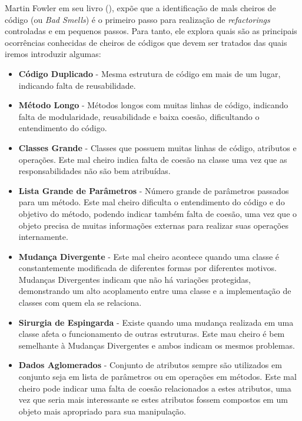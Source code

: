 %

Martin Fowler em seu livro (\citeyear{fowler1999}), expõe que a identificação de mals cheiros de código (ou \emph{Bad Smells}) é o primeiro passo para realização de \emph{refactorings} controladas e em pequenos passos. Para tanto, ele explora quais são as principais ocorrências conhecidas de cheiros de códigos que devem ser tratados das quais iremos introduzir algumas:

\begin{itemize}

\item \textbf{Código Duplicado} - Mesma estrutura de código em mais de um lugar, indicando falta de reusabilidade.

\item \textbf{Método Longo} - Métodos longos com muitas linhas de código, indicando falta de modularidade, reusabilidade e baixa coesão, dificultando o entendimento do código.

\item \textbf{Classes Grande} - Classes que possuem muitas linhas de código, atributos e operações. Este mal cheiro indica falta de coesão na classe uma vez que as responsabilidades não são bem atribuídas.

\item \textbf{Lista Grande de Parâmetros} - Número grande de parâmetros passados para um método. Este mal cheiro dificulta o entendimento do código e do objetivo do método, podendo indicar também falta de coesão, uma vez que o objeto precisa de muitas informações externas para realizar suas operações internamente.

\item \textbf{Mudança Divergente} - Este mal cheiro acontece quando uma classe é constantemente modificada de diferentes formas por diferentes motivos. Mudanças Divergentes indicam que não há variações protegidas, demonstrando um alto acoplamento entre uma classe e a implementação de classes com quem ela se relaciona.

\item \textbf{Sirurgia de Espingarda} - Existe quando uma mudança realizada em uma classe afeta o funcionamento de outras estruturas. Este mau cheiro é bem semelhante à Mudanças Divergentes e ambos indicam os mesmos problemas.

\item \textbf{Dados Aglomerados} - Conjunto de atributos sempre são utilizados em conjunto seja em lista de parâmetros ou em operações em métodos. Este mal cheiro pode indicar uma falta de coesão relacionados a estes atributos, uma vez que seria mais interessante se estes atributos fossem compostos em um objeto mais apropriado para sua manipulação.


\end{itemize}
